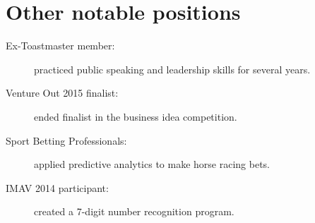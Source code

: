 \documentclass[10pt]{CurriculumVitae}
\begin{document}
     




  \section{Other notable positions}
    \begin{description}
      \item[Ex-Toastmaster member:] practiced public speaking and leadership skills for several years.
      \item[Venture Out 2015 finalist:] ended finalist in the business idea competition.
      \item[Sport Betting Professionals:] applied predictive analytics to make horse racing bets.
      \item[IMAV 2014 participant:] created a 7-digit number recognition program.
    \end{description}
\end{document}
